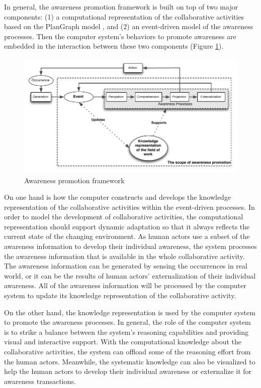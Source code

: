 In general, the awareness promotion framework is built on top of two major components: (1) a computational representation of the collaborative activities based on the PlanGraph model \cite{Cai2003,Cai2005}, and (2) an event-driven model of the awareness processes. Then the computer system's behaviors to promote awareness are embedded in the interaction between these two components (Figure \ref{fig:awareness_promotion_framework}). 

\begin{figure}[htbp] %
   \centering
   \includegraphics{awareness_promotion_framework.pdf} 
   \caption{Awareness promotion framework}
   \label{fig:awareness_promotion_framework}
\end{figure}

On one hand is how the computer constructs and develops the knowledge representation of the collaborative activities within the event-driven processes. In order to model the development of collaborative activities, the computational representation should support dynamic adaptation so that it always reflects the current state of the changing environment. As human actors use a subset of the awareness information to develop their individual awareness, the system processes the awareness information that is available in the whole collaborative activity. The awareness information can be generated by sensing the occurrences in real world, or it can be the results of human actors' externalization of their individual awareness. All of the awareness information will be processed by the computer system to update its knowledge representation of the collaborative activity.

On the other hand, the knowledge representation is used by the computer system to promote the awareness processes. In general, the role of the computer system is to strike a balance between the system's reasoning capabilities and providing visual and interactive support. With the computational knowledge about the collaborative activities, the system can offload some of the reasoning effort from the human actors. Meanwhile, the systematic knowledge can also be visualized to help the human actors to develop their individual awareness or externalize it for awareness transactions. 

